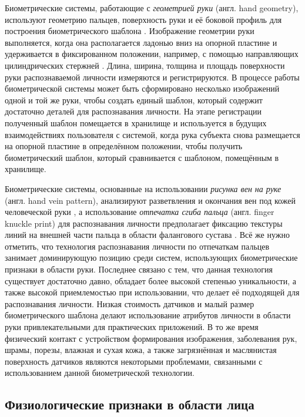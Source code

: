 \documentclass[12pt]{book}
\begin{document}
\large{Биометрические системы, работающие с \textit{геометрией руки} (англ. hand geometry), используют геометрию пальцев, поверхность руки и её боковой профиль для построения биометрического шаблона \cite{unar_2014, taher_2022}. Изображение геометрии руки выполняется, когда она располагается ладонью вниз на опорной пластине и удерживается в фиксированном положении, например, с помощью направляющих цилиндрических стержней \cite{taher_2022}. Длина, ширина, толщина и площадь поверхности руки распознаваемой личности измеряются и регистрируются. В процессе работы биометрической системы может быть сформировано несколько изображений одной и той же руки, чтобы создать единый шаблон, который содержит достаточно деталей для распознавания личности. На этапе регистрации полученный шаблон помещается в хранилище и используется в будущих взаимодействиях пользователя с системой, когда рука субъекта снова размещается на опорной пластине в определённом положении, чтобы получить биометрический шаблон, который сравнивается с шаблоном, помещённым в хранилище.}

\large{Биометрические системы, основанные на использовании \textit{рисунка вен на руке} (англ. hand vein pattern), анализируют разветвления и окончания вен под кожей человеческой руки \cite{unar_2014, tamimi_2019, hemis_2024}, а использование \textit{отпечатка сгиба пальца} (англ. finger knuckle print) для распознавания личности предполагает фиксацию текстуры линий на внешней части пальца в области фалангового сустава \cite{unar_2014, tarawneh_2022}. Всё же нужно отметить, что технология распознавания личности по отпечаткам пальцев занимает доминирующую позицию среди систем, использующих биометрические признаки в области руки. Последнее связано с тем, что данная технология существует достаточно давно, обладает более высокой степенью уникальности, а также высокой приемлемостью при использовании, что делает её подходящей для распознавания личности. Низкая стоимость датчиков и малый размер биометрического шаблона делают использование атрибутов личности в области руки привлекательными для практических приложений. В то же время физический контакт с устройством формирования изображения, заболевания рук, шрамы, порезы, влажная и сухая кожа, а также загрязнённая и маслянистая поверхность датчиков являются некоторыми проблемами, связанными с использованием данной биометрической технологии.}

\subsection{Физиологические признаки в области лица}
\end{document}
